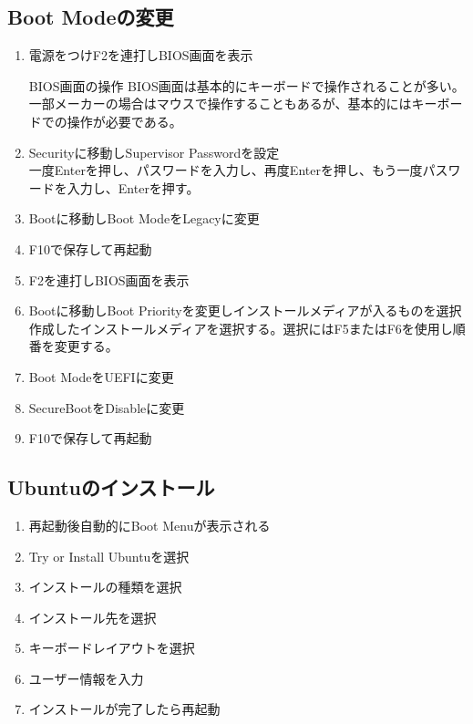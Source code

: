 \documentclass[a4paper, 11pt, dvipdfmx]{jsarticle}
\begin{document}
\subsection{Boot Modeの変更}
  \begin{enumerate}
    \item 電源をつけF2を連打しBIOS画面を表示
    \begin{hosokubox}{BIOS画面の操作}
      BIOS画面は基本的にキーボードで操作されることが多い。一部メーカーの場合はマウスで操作することもあるが、基本的にはキーボードでの操作が必要である。
    \end{hosokubox}
    \item Securityに移動しSupervisor Passwordを設定\\
    一度Enterを押し、パスワードを入力し、再度Enterを押し、もう一度パスワードを入力し、Enterを押す。\\
    \item Bootに移動しBoot ModeをLegacyに変更
    \item F10で保存して再起動
    \item F2を連打しBIOS画面を表示
    \item Bootに移動しBoot Priorityを変更しインストールメディアが入るものを選択\\
    作成したインストールメディアを選択する。選択にはF5またはF6を使用し順番を変更する。\\
    \item Boot ModeをUEFIに変更
    \item SecureBootをDisableに変更
    \item F10で保存して再起動
  \end{enumerate}
\subsection{Ubuntuのインストール}
  \begin{enumerate}
    \item 再起動後自動的にBoot Menuが表示される
    \item Try or Install Ubuntuを選択
    \item インストールの種類を選択
    \item インストール先を選択
    \item キーボードレイアウトを選択
    \item ユーザー情報を入力
    \item インストールが完了したら再起動
  \end{enumerate}
\end{document}
